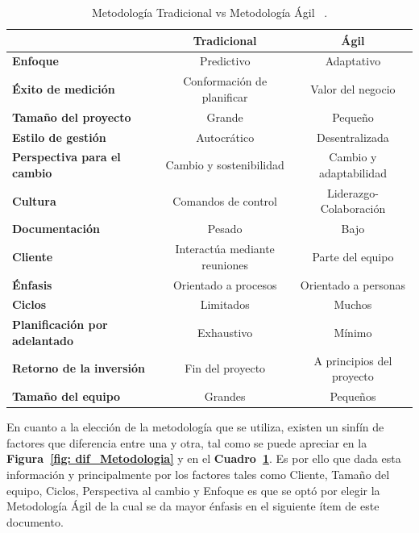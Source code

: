 \begin{table}[htb]
    
    \caption{\label{tab: tab_dif_Metodologia} Metodología Tradicional vs Metodología Ágil ~\cite{17}. }
    \footnotesize
    \begin{tabular}{| l || c | c |}
    
    \hline
      & \textbf{Tradicional} & \textbf{Ágil} \\
    
    \hline\hline
    
    \textbf{Enfoque} & Predictivo & Adaptativo\\ \hline

    \textbf{Éxito de medición}   & Conformación de planificar & Valor del negocio\\ \hline

    \textbf{Tamaño del proyecto} & Grande & Pequeño\\ \hline

    \textbf{Estilo de gestión} & Autocrático & Desentralizada \\ \hline

    \textbf{Perspectiva para el cambio} & Cambio y sostenibilidad & Cambio y adaptabilidad\\ \hline

    \textbf{Cultura} & Comandos de control & Liderazgo-Colaboración\\ \hline

    \textbf{Documentación} & Pesado & Bajo\\ \hline

    \textbf{Cliente} & Interactúa mediante reuniones & Parte del equipo\\ \hline

    \textbf{Énfasis} & Orientado a procesos & Orientado a personas\\ \hline
    
    \textbf{Ciclos} & Limitados & Muchos\\ \hline
    
    \textbf{Planificación por adelantado} & Exhaustivo & Mínimo\\ \hline
    
    \textbf{Retorno de la inversión} & Fin del proyecto & A principios del proyecto\\ \hline

    \textbf{Tamaño del equipo} & Grandes & Pequeños\\ \hline
    \end{tabular}  
\end{table}

En cuanto a la elección de la metodología que se utiliza, existen un sinfín de factores que diferencia entre una y otra, tal como se puede apreciar en la \textbf{Figura~\ref{fig: dif_Metodologia}}  y en el \textbf{Cuadro~\ref{tab: tab_dif_Metodologia}}. Es por ello que dada esta información y principalmente por los factores tales como Cliente, Tamaño del equipo, Ciclos, Perspectiva al cambio y Enfoque es que se optó por elegir la Metodología Ágil de la cual se da mayor énfasis en el siguiente ítem de este documento.
